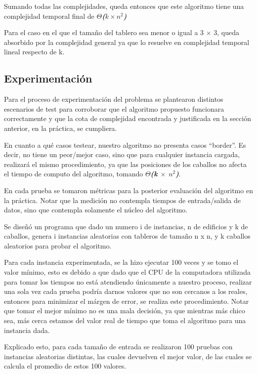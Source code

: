 \documentclass[10pt,a4paper]{article}
\begin{document}
Sumando todas las complejidades, queda entonces que este algoritmo tiene una complejidad temporal final de \textbf{\textit{$\Theta$($k \times n^2$)}}

Para el caso en el que el tamaño del tablero sea menor o igual a 3 $\times$ 3, queda absorbido por la complejidad general ya que lo resuelve en complejidad temporal lineal respecto de k.
\newpage
\subsection{Experimentación}
Para el proceso de experimentación del problema se plantearon distintos escenarios de test para corroborar que el algoritmo propuesto funcionara correctamente y que la cota de complejidad encontrada y justificada en la sección anterior, en la práctica, se cumpliera.

En cuanto a qué casos testear, nuestro algoritmo no presenta casos “border”. Es decir, no tiene un peor/mejor caso, sino que para cualquier instancia cargada, realizará el mismo procedimiento, ya que las posiciones de los caballos no afecta el tiempo de computo del algoritmo, tomando \textbf{$\Theta$\textit{(k $\times$ $n^2$)}}.

En cada prueba se tomaron métricas para la posterior evaluación del algoritmo en la práctica. Notar que la medición no contempla tiempos de entrada/salida de datos, sino que contempla solamente el núcleo del algoritmo.

Se diseñó un programa que dado un numero i de instancias, n de edificios y k de caballos, genera i instancias aleatorias con tableros de tamaño n x n, y k caballos aleatorios para probar el algoritmo.

Para cada instancia experimentada, se la hizo ejecutar 100 veces y se tomo el valor mínimo, esto es debido a que dado que el CPU de la computadora utilizada para tomar los tiempos no está atendiendo únicamente a nuestro proceso, realizar una sola vez cada prueba podría darnos valores que no son cercanos a los reales, entonces para minimizar el márgen de error, se realiza este procedimiento. Notar que tomar el mejor mínimo no es una mala decisión, ya que mientras más chico sea, más cerca estamos del valor real de tiempo que toma el algoritmo para una instancia dada.

Explicado esto, para cada tamaño de entrada se realizaron 100 pruebas con instancias aleatorias distintas, las cuales devuelven el mejor valor, de las cuales se calcula el promedio de estos 100 valores. 
\end{document}
